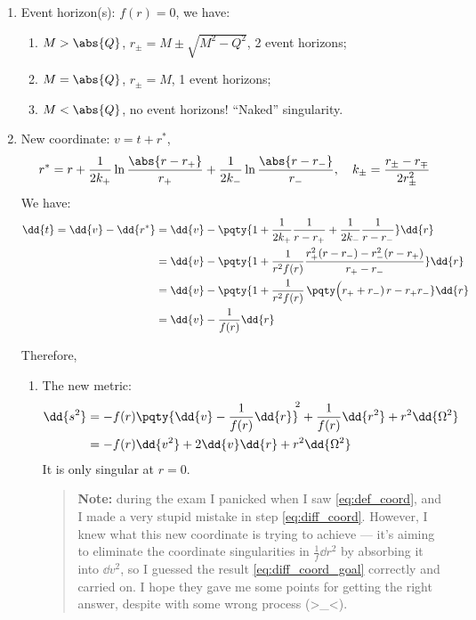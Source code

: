 \documentclass[a4paper
	,10pt
]{article}
\begin{document}
\begin{enumerate}
\item Event horizon(s): $f(r) = 0$, we have:
	\begin{enumerate}
	\item $M > \abs{Q}$, $r_\pm = M \pm \sqrt{M^2 - Q^2}$, 2 event horizons;
	\item $M = \abs{Q}$, $r_\pm = M$, 1 event horizons;
	\item $M < \abs{Q}$, no event horizons! ``Naked'' singularity.
	\end{enumerate}
	
\item New coordinate: $v = t + r^*$,
	\begin{equation}
		r^* = r
			+ \frac{1}{2k_+}
				\ln \frac{\abs{r - r_+}}{r_+}
			+ \frac{1}{2k_-}
				\ln \frac{\abs{r - r_-}}{r_-},
	\quad
		k_\pm
		= \frac{r_\pm - r_\mp}{2r_\pm^2}
	\label{eq:def_coord}
	\end{equation}
	We have:
	\begin{align}
		\dd{t}
		= \dd{v} - \dd{r^*}
		&= \dd{v} - \pqty{
				1 + \frac{1}{2k_+} \frac{1}{r - r_+}
				+ \frac{1}{2k_-} \frac{1}{r - r_-}
			} \dd{r}
		\label{eq:diff_coord}
		\\
		&= \dd{v} - \pqty{
				1 + \frac{1}{r^2 f(r)}
				\frac{
					r_+^2 (r - r_-)
					- r_-^2 (r - r_+)
				}{r_+ - r_-}
			} \dd{r} \notag\\
		&= \dd{v} - \pqty{
				1 + \frac{1}{r^2 f(r)}\,
				\pqty\Big{
					(r_+ + r_-)\,r
					- r_+ r_-
				}
			} \dd{r} \notag\\
		&= \dd{v} - \frac{1}{f(r)} \dd{r}
		\label{eq:diff_coord_goal}
	\end{align}
	
	Therefore,
	\begin{enumerate}[parsep=\parskip]
	\item The new metric:
	\begin{align}
		\dd{s^2}
		&= - f(r) \pqty{
				\dd{v}
				- \frac{1}{f(r)} \dd{r}
			}^{\!\!2}
			+ \frac{1}{f(r)} \dd{r^2}
			+ r^2 \dd{\Omega^2} \\
		&= - f(r) \dd{v^2}
			+ 2 \dd{v} \dd{r}
			+ r^2 \dd{\Omega^2} \notag
	\end{align}
	It is only singular at $r = 0$.
	
	\begin{quote}
	\textbf{Note:} during the exam I panicked when I saw \eqref{eq:def_coord}, and I made a very stupid mistake in step \eqref{eq:diff_coord}. However, I knew what this new coordinate is trying to achieve --- it's aiming to eliminate the coordinate singularities in $\frac{1}{f} \dd{r^2}$ by absorbing it into $\dd{v^2}$, so I guessed the result \eqref{eq:diff_coord_goal} correctly and carried on. I hope they gave me some points for getting the right answer, despite with some wrong process (>\_<).
	\end{quote}
	

\end{enumerate}
\end{enumerate}
\end{document}
